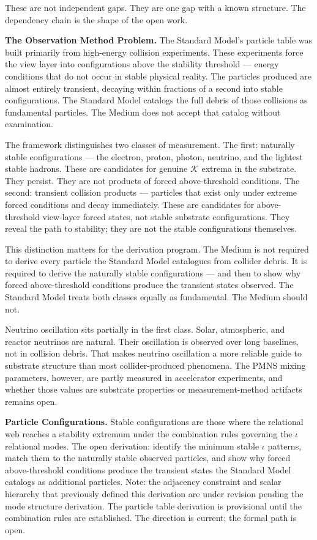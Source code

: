\documentclass[11pt,letterpaper]{article}
\newcommand{\Kappa}{\mathcal{K}}
\begin{document}
These are not independent gaps. They are one gap with a known structure. The dependency chain is the shape of the open work.

\textbf{The Observation Method Problem.} The Standard Model's particle table was built primarily from high-energy collision experiments. These experiments force the view layer into configurations above the stability threshold --- energy conditions that do not occur in stable physical reality. The particles produced are almost entirely transient, decaying within fractions of a second into stable configurations. The Standard Model catalogs the full debris of those collisions as fundamental particles. The Medium does not accept that catalog without examination.

The framework distinguishes two classes of measurement. The first: naturally stable configurations --- the electron, proton, photon, neutrino, and the lightest stable hadrons. These are candidates for genuine \(\Kappa\) extrema in the substrate. They persist. They are not products of forced above-threshold conditions. The second: transient collision products --- particles that exist only under extreme forced conditions and decay immediately. These are candidates for above-threshold view-layer forced states, not stable substrate configurations. They reveal the path to stability; they are not the stable configurations themselves.

This distinction matters for the derivation program. The Medium is not required to derive every particle the Standard Model catalogues from collider debris. It is required to derive the naturally stable configurations --- and then to show why forced above-threshold conditions produce the transient states observed. The Standard Model treats both classes equally as fundamental. The Medium should not.

Neutrino oscillation sits partially in the first class. Solar, atmospheric, and reactor neutrinos are natural. Their oscillation is observed over long baselines, not in collision debris. That makes neutrino oscillation a more reliable guide to substrate structure than most collider-produced phenomena. The PMNS mixing parameters, however, are partly measured in accelerator experiments, and whether those values are substrate properties or measurement-method artifacts remains open.

\textbf{Particle Configurations.} Stable configurations are those where the relational web reaches a stability extremum under the combination rules governing the \(\iota\) relational modes. The open derivation: identify the minimum stable \(\iota\) patterns, match them to the naturally stable observed particles, and show why forced above-threshold conditions produce the transient states the Standard Model catalogs as additional particles. Note: the adjacency constraint and scalar hierarchy that previously defined this derivation are under revision pending the mode structure derivation. The particle table derivation is provisional until the combination rules are established. The direction is current; the formal path is open.
\end{document}

